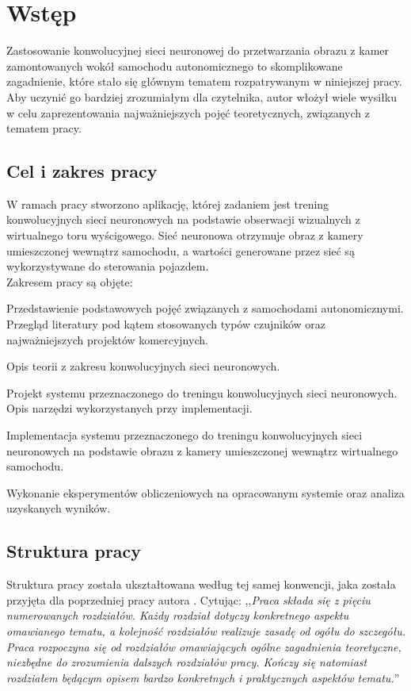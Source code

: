 \chapter*{Wstęp}
Zastosowanie konwolucyjnej sieci neuronowej do przetwarzania obrazu z kamer zamontowanych wokół 
samochodu autonomicznego to skomplikowane zagadnienie, które stało się głównym tematem rozpatrywanym w niniejszej pracy. Aby uczynić go bardziej zrozumiałym dla czytelnika, autor włożył wiele wysiłku w celu zaprezentowania najważniejszych pojęć teoretycznych, związanych z tematem pracy.

\section*{Cel i zakres pracy}
W ramach pracy stworzono aplikację, której zadaniem jest trening konwolucyjnych sieci neuronowych na podstawie obserwacji wizualnych z wirtualnego toru wyścigowego. Sieć neuronowa otrzymuje obraz z kamery umieszczonej wewnątrz samochodu, a wartości generowane przez sieć są wykorzystywane do sterowania pojazdem. \\
Zakresem pracy są objęte:
\begin{enumerate*}
\item Przedstawienie podstawowych pojęć związanych z samochodami autonomicznymi. Przegląd literatury pod kątem stosowanych typów czujników oraz najważniejszych projektów komercyjnych.
\item Opis teorii z zakresu konwolucyjnych sieci neuronowych.
\item Projekt systemu przeznaczonego do treningu konwolucyjnych sieci neuronowych. Opis narzędzi wykorzystanych przy implementacji.
\item Implementacja systemu przeznaczonego do treningu konwolucyjnych sieci neuronowych na podstawie obrazu z kamery umieszczonej wewnątrz wirtualnego samochodu.
\item Wykonanie eksperymentów obliczeniowych na opracowanym systemie oraz analiza uzyskanych wyników.
\end{enumerate*}

\newpage
\section*{Struktura pracy}
Struktura pracy została ukształtowana według tej samej konwencji, jaka została przyjęta dla poprzedniej pracy autora \cite{galios:thesis}. Cytując: ,,\textit{Praca składa się z pięciu numerowanych rozdziałów. Każdy rozdział dotyczy konkretnego aspektu omawianego tematu, a kolejność rozdziałów realizuje zasadę od ogółu do szczegółu. Praca rozpoczyna się od rozdziałów omawiających ogólne zagadnienia teoretyczne,
niezbędne do zrozumienia dalszych rozdziałów pracy. Kończy się natomiast rozdziałem będącym opisem bardzo konkretnych i praktycznych aspektów tematu.}''

